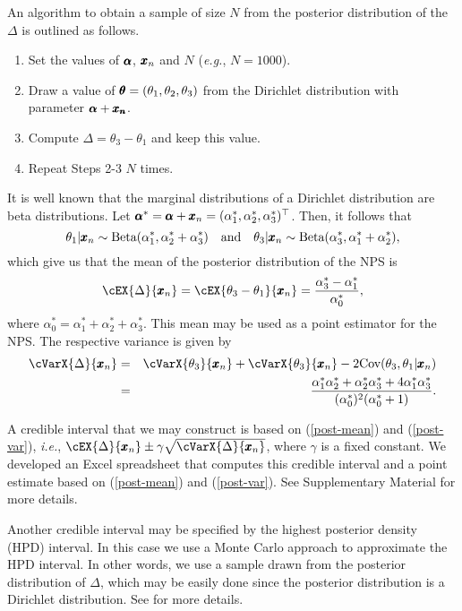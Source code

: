 \documentclass[12pt,a4paper]{article}%
\newcommand*{\bff}[1]{\ifmmode\pmb{#1}\else\textbf{#1}\fi}
\begin{document}
An algorithm to obtain a sample of size $N$ from the posterior distribution of the $\Delta$ is outlined as follows.

\begin{enumerate}
 \item Set the values of $\bff{\alpha}$, $\bff{x}_n$ and $N$ ({\it e.g.}, $N=1000$).
 \item Draw a value of $\bff{\theta}=(\theta_1,\theta_2,\theta_3)$ from the Dirichlet distribution with parameter $\bff{\alpha}+\bff{x_n}$.
 \item Compute $\Delta=\theta_3-\theta_1$ and keep this value.
 \item Repeat Steps 2-3 $N$ times.
\end{enumerate}

It is well known that the marginal distributions of a Dirichlet distribution are beta distributions. Let $\bff{\alpha}^*=\bff{\alpha}+\bff{x}_n=(\alpha_1^*, \alpha_2^*, \alpha_3^*)^\top$. Then, it follows that
$$\theta_1|\bff{x}_n\sim\text{Beta}(\alpha_1^*, \alpha_2^*+\alpha_3^*)\quad\text{and}\quad\theta_3|\bff{x}_n\sim\text{Beta}(\alpha_3^*, \alpha_1^*+\alpha_2^*),$$
%
which give us that the mean of the posterior distribution of the NPS is
%
\begin{eqnarray}\label{post-mean}
 \cEX{\Delta}{\bff{x}_ n}=\cEX{\theta_3-\theta_1}{\bff{x}_n}=\frac{\alpha_3^*-\alpha_1^*}{\alpha_0^*},
\end{eqnarray}
%
where $\alpha_0^*=\alpha_1^*+\alpha_2^*+\alpha_3^*$. This mean may be used as a point estimator for the NPS. The respective variance is given by
%
\begin{eqnarray}\label{post-var}
 \cVarX{\Delta}{\bff{x}_n}&=&\cVarX{\theta_3}{\bff{x}_n}+\cVarX{\theta_3}{\bff{x}_n}-2\text{Cov}(\theta_3,\theta_1|\bff{x}_n)\nonumber\\
 &=&\frac{\alpha_1^*\alpha_2^*+\alpha_2^*\alpha_3^*+4\alpha_1^*\alpha_3^*}{(\alpha_0^*)^2(\alpha_0^*+1)}.
\end{eqnarray}
%

A credible interval that we may construct is based on (\ref{post-mean}) and (\ref{post-var}), {\it i.e.}, $\cEX{\Delta}{\bff{x}_ n}\pm \gamma\sqrt{\cVarX{\Delta}{\bff{x}_n}}$, where $\gamma$ is a fixed constant. We developed an Excel spreadsheet that computes this credible interval and a point estimate based on (\ref{post-mean}) and (\ref{post-var}). See Supplementary Material for more details.

Another credible interval may be specified by the highest posterior density (HPD) interval. In this case we use a Monte Carlo approach to approximate the HPD interval. In other words, we use a sample drawn from the posterior distribution of $\Delta$, which may be easily done since the posterior distribution is a Dirichlet distribution. See \citet[][pgs. 47-48]{Turkmanetal2019} for more details.
\end{document}
